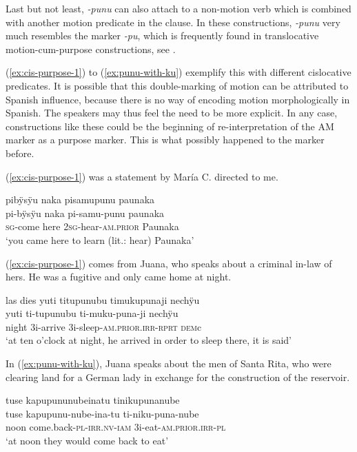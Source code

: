 Last but not least, \textit{-punu} can also attach to a non-motion verb which is combined with another motion predicate in the clause. In these constructions, \textit{-punu} very much resembles the  marker \textit{-pu}, which is frequently found in translocative motion-cum-purpose constructions, see . 

(\ref{ex:cis-purpose-1}) to (\ref{ex:punu-with-ku}) exemplify this with different cislocative predicates. It is possible that this double-marking of motion can be attributed to Spanish influence, because there is no way of encoding motion morphologically in Spanish. The speakers may thus feel the need to be more explicit. In any case, constructions like these could be the beginning of re-interpretation of the AM marker as a purpose marker. This is what possibly happened to the  marker before.

(\ref{ex:cis-purpose-1}) was a statement by María C. directed to me.

\ea\label{ex:cis-purpose-1}
\begingl 
\glpreamble pibÿsÿu naka pisamupunu paunaka\\
\gla pi-bÿsÿu naka pi-samu-punu paunaka\\ 
\textsc{sg}-come here 2\textsc{sg}-hear-\textsc{am.prior} Paunaka\\ 
\glft ‘you came here to learn (lit.: hear) Paunaka’
\trailingcitation{[uxx-p110825l.036]}
\xe

(\ref{ex:cis-purpose-1}) comes from Juana, who speaks about a criminal in-law of hers. He was a fugitive and only came home at night.

\ea\label{ex:cis-purpose-2}
\begingl 
\glpreamble las dies yuti titupunubu timukupunaji nechÿu\\
 yuti ti-tupunubu ti-muku-puna-ji nechÿu\\ 
 night 3i-arrive 3i-sleep-\textsc{am.prior.irr}-\textsc{rprt} \textsc{dem}c\\ 
\glft ‘at ten o’clock at night, he arrived in order to sleep there, it is said’
\trailingcitation{[jxx-p120430l-2.115]}
\xe

In (\ref{ex:punu-with-ku}), Juana speaks about the men of Santa Rita, who were clearing land for a German lady in exchange for the construction of the reservoir.

\ea\label{ex:punu-with-ku}
\begingl 
\glpreamble tuse kapupununubeinatu tinikupunanube\\
\gla tuse kapupunu-nube-ina-tu ti-niku-puna-nube\\ 
\glb noon come.back-\textsc{pl}-\textsc{irr.nv}-\textsc{iam} 3i-eat-\textsc{am.prior.irr}-\textsc{pl}\\ 
\glft ‘at noon they would come back to eat’
\trailingcitation{[jxx-p120515l-2.187]}
\xe



